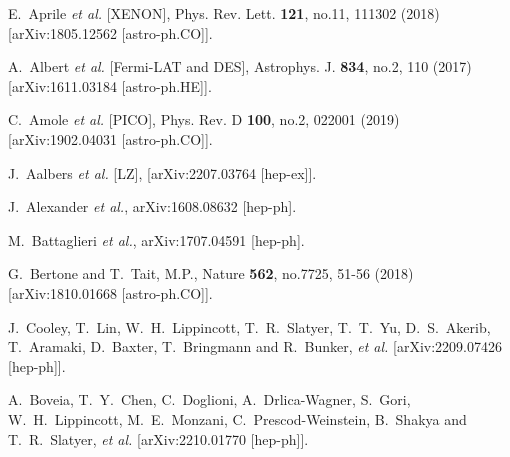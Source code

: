 \documentclass[14pt]{article}
\begin{document}
{\begin{thebibliography}{99}
E.~Aprile \textit{et al.} [XENON],
Phys. Rev. Lett. \textbf{121}, no.11, 111302 (2018)
[arXiv:1805.12562 [astro-ph.CO]]. 

A.~Albert \textit{et al.} [Fermi-LAT and DES],
Astrophys. J. \textbf{834}, no.2, 110 (2017)
[arXiv:1611.03184 [astro-ph.HE]].

C.~Amole \textit{et al.} [PICO],
Phys. Rev. D \textbf{100}, no.2, 022001 (2019)
[arXiv:1902.04031 [astro-ph.CO]].

J.~Aalbers \textit{et al.} [LZ],
[arXiv:2207.03764 [hep-ex]].


  J.~Alexander {\it et al.},
  arXiv:1608.08632 [hep-ph].

  M.~Battaglieri {\it et al.},
  arXiv:1707.04591 [hep-ph].
  
G.~Bertone and T.~Tait, M.P.,
Nature \textbf{562}, no.7725, 51-56 (2018)
[arXiv:1810.01668 [astro-ph.CO]].

J.~Cooley, T.~Lin, W.~H.~Lippincott, T.~R.~Slatyer, T.~T.~Yu, D.~S.~Akerib, T.~Aramaki, D.~Baxter, T.~Bringmann and R.~Bunker, \textit{et al.}
[arXiv:2209.07426 [hep-ph]].

A.~Boveia, T.~Y.~Chen, C.~Doglioni, A.~Drlica-Wagner, S.~Gori, W.~H.~Lippincott, M.~E.~Monzani, C.~Prescod-Weinstein, B.~Shakya and T.~R.~Slatyer, \textit{et al.}
[arXiv:2210.01770 [hep-ph]].



\end{thebibliography}}
\end{document}
